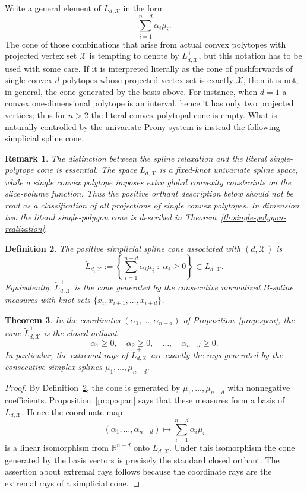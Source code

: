 \documentclass[reqno]{amsart}
\newtheorem{theorem}{Theorem}
\numberwithin{theorem}{section}
\newtheorem{definition}[theorem]{Definition}
\newtheorem{remark}[theorem]{Remark}
\newcommand{\RR}{\mathbb{R}}
\newcommand{\cX}{\mathcal{X}}
\newcommand{\al}{\alpha}
\begin{document}
Write a general element of $L_{d,\cX}$ in the form
\[
\sum_{i=1}^{n-d} \al_i\mu_i.
\]
The cone of those combinations that arise from actual convex polytopes with projected vertex set $\cX$ is tempting to denote by $L_{d,\cX}^+$, but this notation has to be used with some care. If it is interpreted literally as the cone of pushforwards of single convex $d$-polytopes whose projected vertex set is exactly $\cX$, then it is not, in general, the cone generated by the basis above. For instance, when $d=1$ a convex one-dimensional polytope is an interval, hence it has only two projected vertices; thus for $n>2$ the literal convex-polytopal cone is empty. What is naturally controlled by the univariate Prony system is instead the following simplicial spline cone.

\begin{remark}\label{rem:literal-polytope-cone}
The distinction between the spline relaxation and the literal single-polytope cone is essential. The space $L_{d,\cX}$ is a fixed-knot univariate spline space, while a single convex polytope imposes extra global convexity constraints on the slice-volume function. Thus the positive orthant description below should not be read as a classification of all projections of single convex polytopes. In dimension two the literal single-polygon cone is described in Theorem~\ref{th:single-polygon-realization}.
\end{remark}

\begin{definition}\label{def:spline-positive-cone}
The \emph{positive simplicial spline cone} associated with $(d,\cX)$ is
\[
\widetilde L_{d,\cX}^+
:=\left\{\sum_{i=1}^{n-d}\al_i\mu_i\;:\;\al_i\ge 0\right\}\subset L_{d,\cX}.
\]
Equivalently, $\widetilde L_{d,\cX}^+$ is the cone generated by the consecutive normalized $B$-spline measures with knot sets
$\{x_i,x_{i+1},\dots,x_{i+d}\}$.
\end{definition}

\begin{theorem}\label{th:positive-cone}
In the coordinates $(\al_1,\dots,\al_{n-d})$ of Proposition~\ref{prop:span}, the cone $\widetilde L_{d,\cX}^+$ is the closed orthant
\[
\al_1\ge 0,
\quad \al_2\ge 0,
\quad \dots,
\quad \al_{n-d}\ge 0.
\]
In particular, the extremal rays of $\widetilde L_{d,\cX}^+$ are exactly the rays generated by the consecutive simplex splines $\mu_1,\dots,\mu_{n-d}$.
\end{theorem}

\begin{proof}
By Definition~\ref{def:spline-positive-cone}, the cone is generated by $\mu_1,\dots,\mu_{n-d}$ with nonnegative coefficients. Proposition~\ref{prop:span} says that these measures form a basis of $L_{d,\cX}$. Hence the coordinate map
\[
(\al_1,\dots,\al_{n-d})\longmapsto \sum_{i=1}^{n-d}\al_i\mu_i
\]
is a linear isomorphism from $\RR^{n-d}$ onto $L_{d,\cX}$. Under this isomorphism the cone generated by the basis vectors is precisely the standard closed orthant. The assertion about extremal rays follows because the coordinate rays are the extremal rays of a simplicial cone.
\end{proof}
\end{document}
